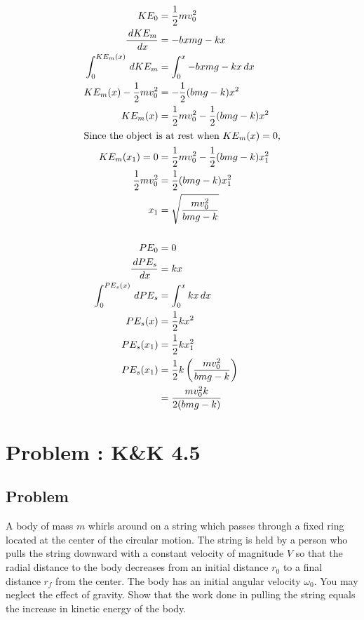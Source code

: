 \documentclass[solutions]{esg8012pset}
\renewcommand{\d}{\,d}
\begin{document}
\begin{align*}
  KE_0 & = \frac{1}{2}m v_0^2 \\
  \frac{\d KE_m}{\d x} & = -bx m g - kx \\
  \int_0^{KE_m(x)} \d{KE_m} & = \int_0^x {-bx m g - kx}\d x \\
  KE_m(x) - \frac{1}{2}m v_0^2 & = -\frac{1}{2}(b m g - k)x^2 \\
  KE_m(x) & = \frac{1}{2}m v_0^2 - \frac{1}{2}(b m g - k)x^2 \\
  \intertext{Since the object is at rest when $KE_m(x) = 0$,}
  KE_m(x_1) = 0 & = \frac{1}{2}m v_0^2 - \frac{1}{2}(b m g - k)x_1^2 \\
  \frac{1}{2}m v_0^2 & = \frac{1}{2}(b m g - k)x_1^2 \\
  x_1 & = \sqrt{\frac{m v_0^2}{b m g - k}} \\
  \\
  PE_0 & = 0 \\
  \frac{\d PE_s}{\d x} & = k x \\
  \int_0^{PE_s(x)} \d{PE_s} & = \int_0^x k x \d x \\
  PE_s(x) & = \frac{1}{2}k x^2 \\
  PE_s(x_1) & = \frac{1}{2}k x_1^2 \\
  PE_s(x_1) & = \frac{1}{2} k \left(\frac{m v_0^2}{b m g - k}\right) \\
   & = \frac{m v_0^2 k}{2(b m g - k)}
\end{align*}
\section{Problem \thesection: K\&K 4.5}
\subsection{Problem}
  A body of mass $m$ whirls around on a string which passes through a fixed ring located at the center of the circular motion. The string is held by a person who pulls the string downward with a constant velocity of magnitude $V$ so that the radial distance to the body decreases from an initial distance $r_0$ to a final distance $r_f$ from the center. The body has an initial angular velocity $\omega_0$. You may neglect the effect of gravity. Show that the work done in pulling the string equals the increase in kinetic energy of the body.
\end{document}
